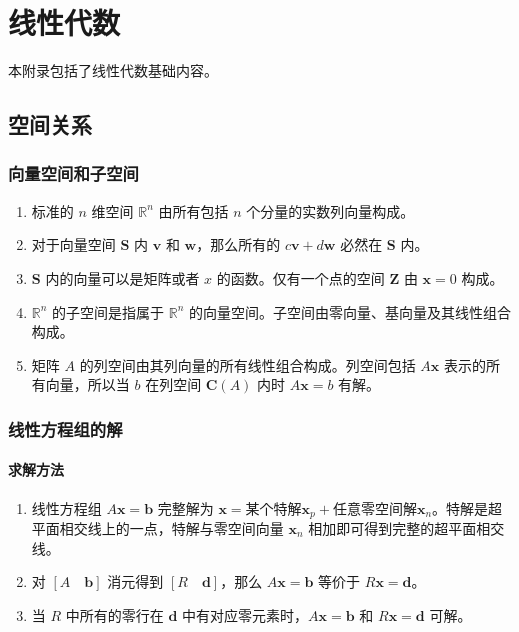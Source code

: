 \documentclass[cn,11pt,chinese,blue,bibstyle=ieeetr]{elegantbook}
\begin{document}
{\chapter{线性代数}


本附录包括了线性代数基础内容。

\section{空间关系}

\subsection{向量空间和子空间}

\begin{enumerate}
\item 标准的 $n$ 维空间 $\mathbb{R}^n$ 由所有包括 $n$ 个分量的实数列向量构成。
\item 对于向量空间 $\bm{S}$ 内 $\bm{v}$ 和 $\bm{w}$，那么所有的 $c\bm{v} + d\bm{w}$ 必然在 $\bm{S}$ 内。
\item $\bm{S}$ 内的向量可以是矩阵或者 $x$ 的函数。仅有一个点的空间 $\bm{Z}$ 由 $\bm{x} = 0$ 构成。
\item $\mathbb{R}^n$ 的子空间是指属于 $\mathbb{R}^n$ 的向量空间。子空间由零向量、基向量及其线性组合构成。
\item 矩阵 $A$ 的列空间由其列向量的所有线性组合构成。列空间包括 $A\bm{x}$ 表示的所有向量，所以当 $b$ 在列空间 $\bm{C}\left(A\right)$ 内时 $A\bm{x} = b$ 有解。
\end{enumerate}


\subsection{线性方程组的解}


\subsubsection{求解方法}

\begin{enumerate}
\item 线性方程组 $A\bm{x}=\bm{b}$ 完整解为 $\bm{x} = \text{某个特解} \bm{x}_p + \text{任意零空间解} \bm{x}_n$。特解是超平面相交线上的一点，特解与零空间向量 $\bm{x}_n$ 相加即可得到完整的超平面相交线。
\item 对 $\left[A \quad \bm{b}\right]$ 消元得到 $\left[R \quad \bm{d}\right]$，那么 $A\bm{x}=\bm{b}$ 等价于 $R\bm{x}=\bm{d}$。
\item 当 $R$ 中所有的零行在 $\bm{d}$ 中有对应零元素时，$A\bm{x}=\bm{b}$ 和 $R\bm{x}=\bm{d}$ 可解。
\end{enumerate}

}
\end{document}
